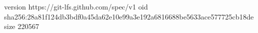 version https://git-lfs.github.com/spec/v1
oid sha256:28a81f124db3bdf0a45da62e10e99a3e192a6816688be5633ace577725cb18de
size 220567
